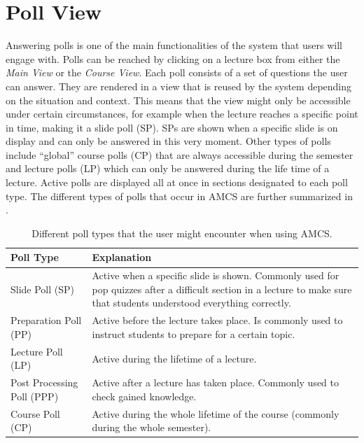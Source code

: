 \section{Poll View}
\label{section:soa:pollview}
Answering polls is one of the main functionalities of the system that users will engage with.
Polls can be reached by clicking on a lecture box from either the \emph{Main View} or the \emph{Course View}.
Each poll consists of a set of questions the user can answer. They are rendered in a view that is reused by the system depending on the situation and context. This means that the view might only be accessible under certain circumstances, for example when the lecture reaches a specific point in time, making it a slide poll (SP). SPs are shown when a specific slide is on display and can only be answered in this very moment. Other types of polls include “global” course polls (CP) that are always accessible during the semester and lecture polls (LP) which can only be answered during the life time of a lecture.
Active polls are displayed all at once in sections designated to each poll type.
The different types of polls that occur in AMCS are further summarized in .



\begin{table}[H]
	{\renewcommand{\arraystretch}{2}
		\begin{tabular}{ | p{5cm} | p{10cm} |}
			\hline
			Poll Type & Explanation \\ \hline \hline
			Slide Poll (SP) & Active when a specific slide is shown. Commonly used for pop quizzes after a difficult section in a lecture to make sure that students understood everything correctly. \\ \hline
			Preparation Poll (PP) & Active before the lecture takes place. Is commonly used to instruct students to prepare for a certain topic. \\ \hline
			Lecture Poll (LP) & Active during the lifetime of a lecture. \\ \hline
			Post Processing Poll (PPP) & Active after a lecture has taken place. Commonly used to check gained knowledge. \\ \hline
			Course Poll (CP) & Active during the whole lifetime of the course (commonly during the whole semester). \\
			\hline
		\end{tabular}
	}
	\caption{Different poll types that the user might encounter when using AMCS.}
	\label{tab:pollTypes}
\end{table}

